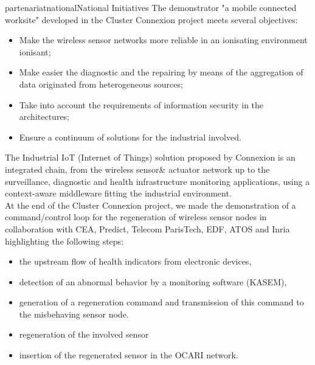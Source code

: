 \documentclass{ra2016}
\begin{document}
\begin{module}{partenariat}{national}{National Initiatives}
The demonstrator "a mobile connected worksite" developed in the Cluster Connexion project meets several objectives:
\begin{itemize}
\item	Make the wireless sensor networks more reliable in an  ionisating environment ionisant;
\item	Make easier the diagnostic and the repairing by means of the aggregation of data originated from heterogeneous sources; 
\item	Take into account the requirements of information security in the architectures;
\item Ensure a continuum of solutions for the industrial involved.\\
\end{itemize}

The Industrial IoT (Internet of Things) solution proposed by Connexion is an integrated chain, from the wireless sensor\& actuator network up to the surveillance, diagnostic and health infrastructure monitoring applications, using a context-aware middleware fitting the industrial environment.\\ 

At the end of the Cluster Connexion project, we made the demonstration of a command/control loop for the regeneration of wireless sensor nodes in collaboration with CEA, Predict, Telecom ParisTech, EDF, ATOS and Inria highlighting the following steps:
\begin{itemize}
\item the upstream flow of health indicators from electronic devices,
\item detection of an abnormal behavior by a monitoring software (KASEM),  
\item generation of a regeneration command and transmission of this command to the misbehaving sensor node.
\item regeneration of the involved sensor
\item insertion of the regenerated sensor in the OCARI network.\\
\end{itemize}



\end{module}
\end{document}
